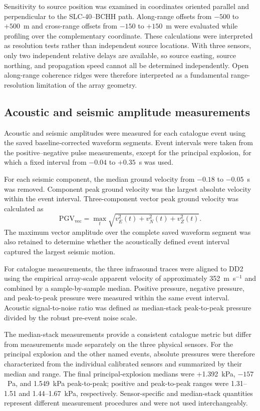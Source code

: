\documentclass[]{seismica}
\begin{document}
Sensitivity to source position was examined in coordinates oriented parallel and perpendicular to the SLC-40--BCHH path. Along-range offsets from $-500$ to $+500$~m and cross-range offsets from $-150$ to $+150$~m were evaluated while profiling over the complementary coordinate. These calculations were interpreted as resolution tests rather than independent source locations. With three sensors, only two independent relative delays are available, so source easting, source northing, and propagation speed cannot all be determined independently. Open along-range coherence ridges were therefore interpreted as a fundamental range-resolution limitation of the array geometry.

\subsection{Acoustic and seismic amplitude measurements}

Acoustic and seismic amplitudes were measured for each catalogue event using
the saved baseline-corrected waveform segments. Event intervals were taken from
the positive--negative pulse measurements, except for the principal explosion,
for which a fixed interval from $-0.04$ to $+0.35$~s was used.

For each seismic component, the median ground velocity from $-0.18$ to $-0.05$~s was removed. Component peak ground velocity was the largest absolute velocity within the event interval. Three-component vector peak ground velocity was calculated as
\begin{equation}
  \mathrm{PGV}_{\mathrm{vec}} = \max_t\sqrt{v_E^2(t)+v_N^2(t)+v_Z^2(t)}.
  \label{eq:vector_pgv}
\end{equation}
The maximum vector amplitude over the complete saved waveform segment was also retained to determine whether the acoustically defined event interval captured the largest seismic motion.

For catalogue measurements, the three infrasound traces were aligned to DD2
using the empirical array-scale apparent velocity of approximately
352~m~s$^{-1}$ and combined by a sample-by-sample median. Positive pressure,
negative pressure, and peak-to-peak pressure were measured within the same
event interval. Acoustic signal-to-noise ratio was defined as median-stack
peak-to-peak pressure divided by the robust pre-event noise scale.

The median-stack measurements provide a consistent catalogue metric but differ
from measurements made separately on the three physical sensors. For the
principal explosion and the other named events, absolute pressures were
therefore characterized from the individual calibrated sensors and summarized
by their median and range. The final principal-explosion medians were
+1.392~kPa, $-157$~Pa, and 1.549~kPa peak-to-peak; positive and peak-to-peak
ranges were 1.31--1.51 and 1.44--1.67~kPa, respectively. Sensor-specific and
median-stack quantities represent different measurement procedures and were
not used interchangeably.
\end{document}
